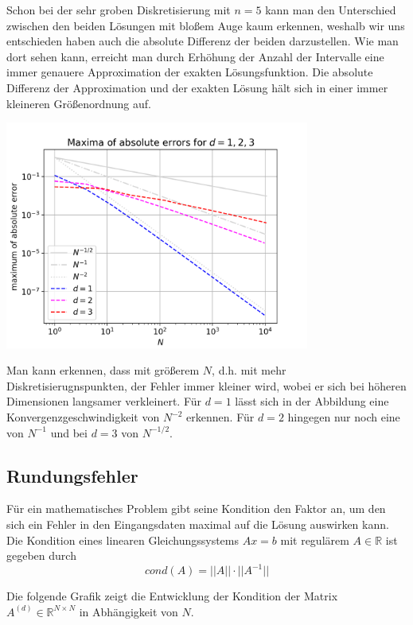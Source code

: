 \documentclass{scrartcl}
\begin{document}
Schon bei der sehr groben Diskretisierung mit $n=5$ kann man den Unterschied zwischen den beiden Lösungen mit bloßem Auge kaum erkennen, weshalb wir uns entschieden haben auch die absolute Differenz der beiden darzustellen.
Wie man dort sehen kann, erreicht man durch Erhöhung der Anzahl der Intervalle eine immer genauere Approximation der exakten Lösungsfunktion. Die absolute Differenz der Approximation und der exakten Lösung hält sich in einer immer kleineren Größenordnung auf.

{
  \centering
    \includegraphics[width=0.75\textwidth]{Grafiken/loglogerr_d123_neu}
    \vspace{-0.2cm}
}
\vspace{0.5cm}

Man kann erkennen, dass mit größerem $N$, d.h. mit mehr Diskretisierugnspunkten, der Fehler immer kleiner wird, wobei er sich bei höheren Dimensionen langsamer verkleinert.
Für $d=1$ lässt sich in der Abbildung eine Konvergenzgeschwindigkeit von $N^{-2}$ erkennen. Für $d=2$ hingegen nur noch eine von $N^{-1}$ und bei $d=3$ von $N^{-1/2}$.


\subsection{Rundungsfehler}
Für ein mathematisches Problem gibt seine Kondition den Faktor an, um den sich ein Fehler in den Eingangsdaten maximal auf die Lösung auswirken kann.
Die Kondition eines linearen Gleichungssystems $Ax = b$ mit regulärem $A\in\mathbb{R}$ ist gegeben durch \[cond(A) = ||A||\cdot||A^{-1}||\]

Die folgende Grafik zeigt die Entwicklung der Kondition der Matrix $A^{(d)}\in\mathbb{R}^{N \times N}$ in Abhängigkeit von $N$.
\end{document}

